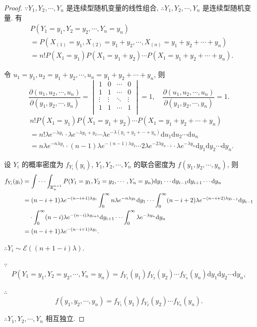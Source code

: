 \documentclass[color=black,device=normal,lang=cn]{elegantnote}
\numberwithin{equation}{section}
\theoremstyle{plain}
\numberwithin{exercise}{exsection}
\begin{document}
\begin{proof}
    $\because Y_1,Y_2,\cdots,Y_n$ 是连续型随机变量的线性组合, $\therefore Y_1,Y_2,\cdots,Y_n$ 是连续型随机变量. 有
    \begin{align*}
        & P(Y_1=y_1,Y_2=y_2,\cdots,Y_n=y_n) \\
        & =P(X_{(1)}=y_1,X_{(2)}=y_1+y_2,\cdots,X_{(n)}=y_1+y_2+\cdots+y_n) \\
        & =n!P(X_1=y_1)P(X_1=y_1+y_2)\cdots P(X_1=y_1+y_2+\cdots+y_n).
    \end{align*}

    令 $u_1=y_1,u_2=y_1+y_2,\cdots,u_n=y_1+y_2+\cdots+y_n$, 则
    \[\dfrac{\partial(u_1,u_2,\cdots,u_n)}{\partial(y_1,y_2,\cdots,y_n)}=\begin{vmatrix}
        1 & 0 & \cdots & 0 \\
        1 & 1 & \cdots & 0 \\
        \vdots & \vdots & \ddots & \vdots \\
        1 & 1 & \cdots & 1 \\
    \end{vmatrix}=1,\quad\dfrac{\partial(u_1,u_2,\cdots,u_n)}{\partial(y_1,y_2,\cdots,y_n)}=1.\]
    \begin{align*}
        & n!P(X_1=y_1)P(X_1=y_1+y_2)\cdots P(X_1=y_1+y_2+\cdots+y_n) \\
        & =n!\lambda e^{-\lambda y_1}\cdot\lambda e^{-\lambda y_1+y_2}\cdots\lambda e^{-\lambda(y_1+y_2+\cdots+y_n)}\mathrm{d}u_1\mathrm{d}u_2\cdots\mathrm{d}u_n \\
        & =n\lambda e^{-n\lambda y_1}\cdot(n-1)\lambda e^{-(n-1)\lambda y_2}\cdots2\lambda e^{-2\lambda y_{n-1}}\cdot\lambda e^{-\lambda y_n}\mathrm{d}y_1\mathrm{d}y_2\cdots\mathrm{d}y_n.
    \end{align*}

    设 $Y_i$ 的概率密度为 $f_{Y_i}(y_i)$, $Y_1,Y_2,\cdots,Y_n$ 的联合密度为 $f(y_1,y_2,\cdots,y_n)$, 则
    \begin{align*}
        f_{Y_i}(y_i) & =\idotsint_{\mathbb{R}_+^{n-1}}P(Y_1=y_1,Y_2=y_2,\cdots,Y_n=y_n)\mathrm{d}y_1\cdots\mathrm{d}y_{i-1}\mathrm{d}y_{i+1}\cdots\mathrm{d}y_n \\
        & =(n-i+1)\lambda e^{-(n-i+1)\lambda y_i}\int_0^\infty n\lambda e^{-n\lambda y_1}\mathrm{d}y_1\cdots\int_0^\infty(n-i+2)\lambda e^{-(n-i+2)\lambda y_{i-1}}\mathrm{d}y_{i-1} \\
        & \quad\cdot\int_0^\infty(n-i)\lambda e^{-(n-i)\lambda y_{i+1}}\mathrm{d}y_{i+1}\cdots\int_0^\infty\lambda e^{-\lambda y_n}\mathrm{d}y_n \\
        & =(n-i+1)\lambda e^{-(n-i+1)\lambda y_i}.
    \end{align*}

    $\therefore Y_i\sim\mathcal{E}((n+1-i)\lambda)$.

    $\because$
    \[P(Y_1=y_1,Y_2=y_2,\cdots,Y_n=y_n)=f_{Y_1}(y_1)f_{Y_2}(y_2)\cdots f_{Y_n}(y_n)\mathrm{d}y_1\mathrm{d}y_2\cdots\mathrm{d}y_n,\]

    $\therefore$
    \[f(y_1,y_2,\cdots,y_n)=f_{Y_1}(y_1)f_{Y_2}(y_2)\cdots f_{Y_n}(y_n).\]

    $\therefore Y_1,Y_2,\cdots,Y_n$ 相互独立.
\end{proof}
\end{document}
